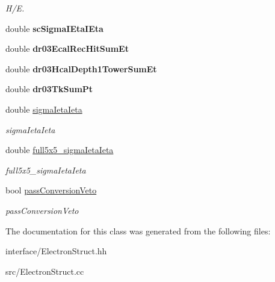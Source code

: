\begin{DoxyCompactItemize}
\begin{DoxyCompactList}\small\item\em H/\-E. \end{DoxyCompactList}\item 
\hypertarget{classran_1_1ElectronStruct_a5c71622e2493756dcc0a395840a25763}{double {\bfseries sc\-Sigma\-I\-Eta\-I\-Eta}}\label{classran_1_1ElectronStruct_a5c71622e2493756dcc0a395840a25763}

\item 
\hypertarget{classran_1_1ElectronStruct_a84a4986795c6fabfafd37387db1c17fc}{double {\bfseries dr03\-Ecal\-Rec\-Hit\-Sum\-Et}}\label{classran_1_1ElectronStruct_a84a4986795c6fabfafd37387db1c17fc}

\item 
\hypertarget{classran_1_1ElectronStruct_aa073696de03fd8e30256b9dc2f4c0d48}{double {\bfseries dr03\-Hcal\-Depth1\-Tower\-Sum\-Et}}\label{classran_1_1ElectronStruct_aa073696de03fd8e30256b9dc2f4c0d48}

\item 
\hypertarget{classran_1_1ElectronStruct_adbd039800bfdaa5b057a55e7e06dc7f3}{double {\bfseries dr03\-Tk\-Sum\-Pt}}\label{classran_1_1ElectronStruct_adbd039800bfdaa5b057a55e7e06dc7f3}

\item 
\hypertarget{classran_1_1ElectronStruct_a6665fd08e43947dd118fc8c646cf136c}{double \hyperlink{classran_1_1ElectronStruct_a6665fd08e43947dd118fc8c646cf136c}{sigma\-Ieta\-Ieta}}\label{classran_1_1ElectronStruct_a6665fd08e43947dd118fc8c646cf136c}

\begin{DoxyCompactList}\small\item\em sigma\-Ieta\-Ieta \end{DoxyCompactList}\item 
\hypertarget{classran_1_1ElectronStruct_a629f78a9ec38d7d846fdd63411488f7e}{double \hyperlink{classran_1_1ElectronStruct_a629f78a9ec38d7d846fdd63411488f7e}{full5x5\-\_\-sigma\-Ieta\-Ieta}}\label{classran_1_1ElectronStruct_a629f78a9ec38d7d846fdd63411488f7e}

\begin{DoxyCompactList}\small\item\em full5x5\-\_\-sigma\-Ieta\-Ieta \end{DoxyCompactList}\item 
\hypertarget{classran_1_1ElectronStruct_a0155c87ef590c4da51a35595ef3e1945}{bool \hyperlink{classran_1_1ElectronStruct_a0155c87ef590c4da51a35595ef3e1945}{pass\-Conversion\-Veto}}\label{classran_1_1ElectronStruct_a0155c87ef590c4da51a35595ef3e1945}

\begin{DoxyCompactList}\small\item\em pass\-Conversion\-Veto \end{DoxyCompactList}\end{DoxyCompactItemize}


The documentation for this class was generated from the following files\-:\begin{DoxyCompactItemize}
\item 
interface/Electron\-Struct.\-hh\item 
src/Electron\-Struct.\-cc\end{DoxyCompactItemize}
